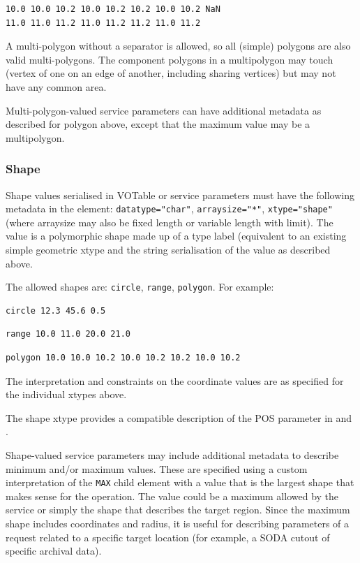 \documentclass[11pt,letter]{ivoa}
\begin{document}
\begin{verbatim}
10.0 10.0 10.2 10.0 10.2 10.2 10.0 10.2 NaN 
11.0 11.0 11.2 11.0 11.2 11.2 11.0 11.2
\end{verbatim}

A multi-polygon without a separator is allowed, so all (simple) polygons are also valid multi-polygons. The
component polygons in a multipolygon may touch (vertex of one on an edge of another, including sharing vertices)
but may not have any common area.

Multi-polygon-valued service parameters can have additional metadata as described 
for polygon above, except that the maximum value may be a multipolygon.

\subsubsection{Shape}
Shape values serialised in VOTable or service parameters must have the following metadata in the 
 element: \verb|datatype="char"|, \verb|arraysize="*"|, \verb|xtype="shape"|
(where arraysize may also be fixed length or variable length with limit).
The value is a polymorphic shape made up of a type label (equivalent to an existing simple
geometric xtype and the string serialisation of the value as described above.

The allowed shapes are: \verb|circle|, \verb|range|, \verb|polygon|. For example:

\begin{verbatim}
circle 12.3 45.6 0.5
\end{verbatim}

\begin{verbatim}
range 10.0 11.0 20.0 21.0
\end{verbatim}

\begin{verbatim}
polygon 10.0 10.0 10.2 10.0 10.2 10.2 10.0 10.2
\end{verbatim}

The interpretation and constraints on the coordinate values are as specified 
for the individual xtypes above.

The shape xtype provides a compatible description of the POS parameter in
\citep{2015ivoa.spec.1223D} and \citep{2017ivoa.spec.0517B}.

Shape-valued service parameters may include additional metadata to describe minimum
and/or maximum values. These are specified using a custom interpretation of the
\verb|MAX| child element with a value that is the largest shape that makes sense
for the operation. The value could be a maximum allowed by the service or simply
the shape that describes the target region. Since the maximum shape includes
coordinates and radius, it is useful for describing parameters of a request related
to a specific target location (for example, a SODA cutout of specific archival data).
\end{document}
